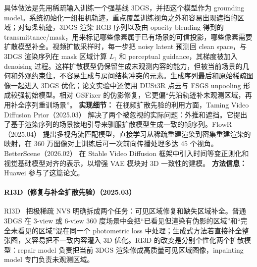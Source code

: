 具体做法是先用稀疏输入训练一个强基线 3DGS，并把这个模型作为 grounding model。系统初始化一组相机轨迹，重点覆盖训练视角之外和容易出现遮挡的区域；对每条轨迹，3DGS 渲染 RGB 序列以及由 opacity blending 得到的 transmittance/mask，用来标记哪些像素属于已有场景的可信投影，哪些像素需要扩散模型补全。视频扩散采样时，每一步把 noisy latent 预测回 clean space，与 3DGS 渲染序列在 mask 区域计算 $L_1$ 和 perceptual guidance，其梯度被加入 denoising 过程。这样扩散模型仍保留生成未观测内容的能力，但被当前场景的几何和外观约束住，不容易生成与房间结构冲突的元素。生成序列最后和原始稀疏图像一起进入 3DGS 优化；论文实验中还使用 DUSt3R 点云与 FSGS unpooling 形成较强初始模型。相对 GSFixer 的伪影修复，它更偏“先沿轨迹补未观测区域，再用补全序列重训场景”。
\textbf{实现细节：} 在视频扩散先验的利用方面，Taming Video Diffusion Prior（2025.03） 解决了两个被忽视的实际问题：外推和遮挡。它提出了基于渲染序列的场景接地引导来驯服扩散模型生成一致的帧序列。FlowR（2025.04） 提出多视角流匹配模型，直接学习从稀疏重建渲染到密集重建渲染的映射，在 360 万图像对上训练后可一次前向传播处理多达 45 个视角。BetterScene（2026.02） 在 Stable Video Diffusion 框架中引入时间等变正则化和视觉基础模型对齐的表示，以增强 VAE 模块对 3D 一致性的建模。
\textbf{方法信息：} Huawei 参与了这篇论文。



\paragraph{RI3D（修复与补全扩散先验）（2025.03）}
RI3D~\cite{2503_10860} 把极稀疏 NVS 明确拆成两个任务：可见区域修复和缺失区域补全。普通 3DGS 在 3-view 或 6-view 360 度场景中会把“已看见但渲染有伪影的区域”和“完全未看见的区域”混在同一个 photometric loss 中处理；生成式方法若直接补全整张图，又容易把不一致内容灌入 3D 优化。RI3D 的改变是分别个性化两个扩散模型：repair model 负责把当前 3DGS 渲染修成高质量可见区域图像，inpainting model 专门负责未观测区域。

